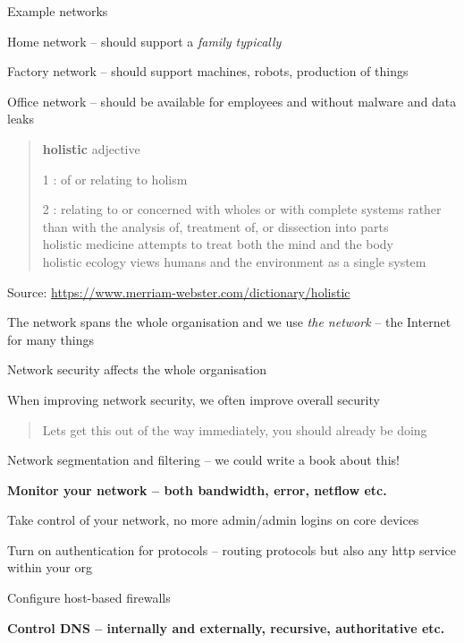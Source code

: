 \documentclass[Screen16to9,17pt]{foils}
\begin{document}
Example networks
\begin{list2}
\item Home network -- should support a \emph{family typically}
\item Factory network -- should support machines, robots, production of things
\item Office network -- should be available for employees and without malware and data leaks
\end{list2}


\begin{quote}
{\bf\Large holistic} adjective

\begin{list2}
\item[1]: of or relating to holism
\item[2] : relating to or concerned with wholes or with complete systems rather than with the analysis of, treatment of, or dissection into parts\\
holistic medicine attempts to treat both the mind and the body\\
holistic ecology views humans and the environment as a single system
\end{list2}
\end{quote}
Source: \url{https://www.merriam-webster.com/dictionary/holistic}

\begin{list2}
\item The network spans the whole organisation and we use \emph{the network} -- the Internet for many things
\item Network security affects the whole organisation
\item When improving network security, we often improve overall security
\end{list2}




\begin{quote}
Lets get this out of the way immediately, you should already be doing
\end{quote}

\begin{list2}
\item Network segmentation and filtering -- we could write a book about this! {\myalert}
\item {\bf Monitor your network -- both bandwidth, error, netflow etc.} {\myalert}
\item Take control of your network, no more admin/admin logins on core devices {\myalert}
\item Turn on authentication for protocols -- routing protocols but also any http service within your org {\myalert}
\item Configure host-based firewalls {\myalert}
\item  {\bf Control DNS -- internally and externally, recursive, authoritative etc.} {\myalert}
\end{list2}
\end{document}
